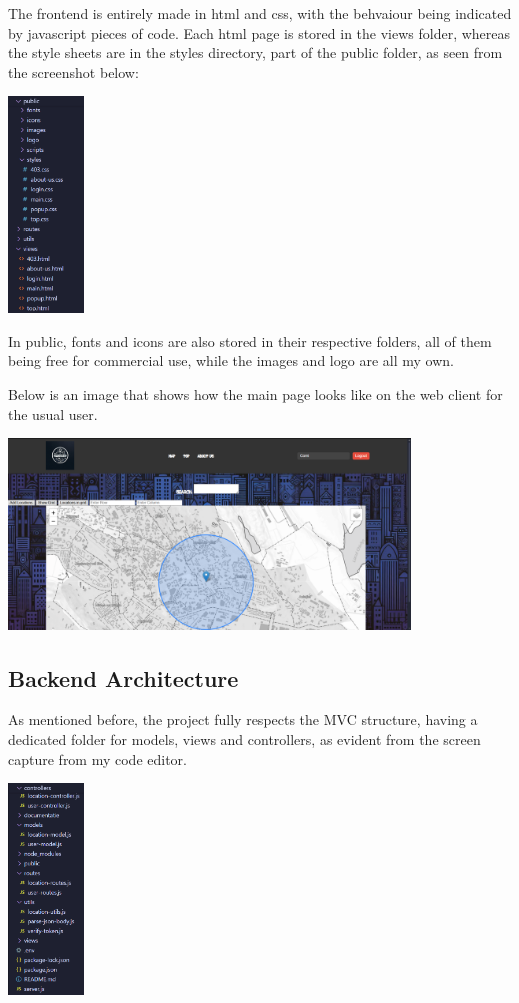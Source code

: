 \documentclass[12pt,a4paper]{report}
\begin{document}
The frontend is entirely made in html and css, with the behvaiour being indicated by javascript pieces of code. Each html page is stored in the views folder, whereas the style sheets are in the styles directory, part of the public folder, as seen from the screenshot below:

\includegraphics[width=0.15\textwidth]{images/front.png}

In public, fonts and icons are also stored in their respective folders, all of them being free for commercial use, while the images and logo are all my own.

Below is an image that shows how the main page looks like on the web client for the usual user.

\begin{center}
\includegraphics[width=0.8\textwidth]{images/ui.png}
\end{center}


\subsection{Backend Architecture}

As mentioned before, the project fully respects the MVC structure, having a dedicated folder for models, views and controllers, as evident from the screen capture from my code editor.

\includegraphics[width=0.15\textwidth]{images/back.png}
\end{document}
